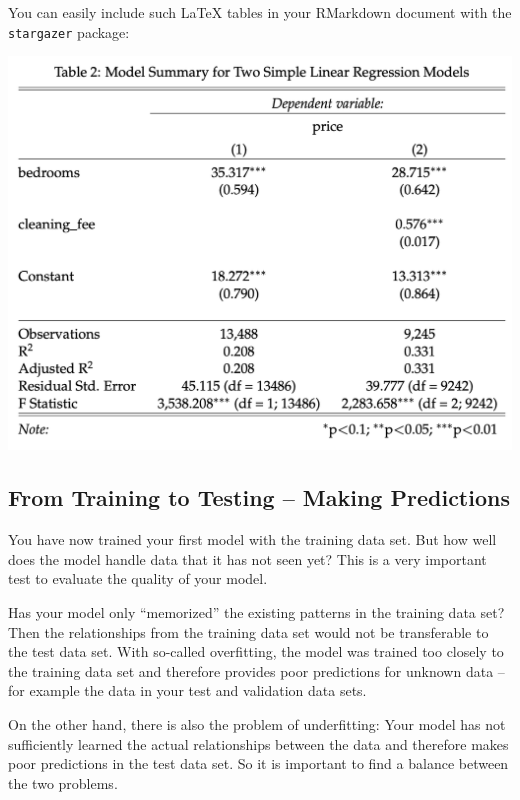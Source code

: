 \documentclass[
  11pt,
]{article}
\newenvironment{tips}[1]
  {
  \begin{itemize}
  \footnotesize
  \renewcommand{\labelitemi}{
    \raisebox{-.7\height}[0pt][0pt]{
      {\setkeys{Gin}{width=3em,keepaspectratio}
        \texttt{[image: images/\#1.png]}}
    }
  }
  \setlength{\fboxsep}{1em}
  \begin{rbox}
  \item
  }
  {
  \end{rbox}
  \end{itemize}
  }
\begin{document}
\begin{tips}r

You can easily include such LaTeX tables in your RMarkdown document with the \texttt{stargazer} package:

\begin{center}\includegraphics[width=1\linewidth]{plot/5_table} \end{center}

\end{tips}

\hypertarget{from-training-to-testing-making-predictions}{%
\subsection{From Training to Testing -- Making Predictions}\label{from-training-to-testing-making-predictions}}

You have now trained your first model with the training data set. But how well does the model handle data that it has not seen yet? This is a very important test to evaluate the quality of your model.

Has your model only ``memorized'' the existing patterns in the training data set?
Then the relationships from the training data set would not be transferable to the test data set. With so-called overfitting, the model was trained too closely to the training data set and therefore provides poor predictions for unknown data -- for example the data in your test and validation data sets.

On the other hand, there is also the problem of underfitting: Your model has not sufficiently learned the actual relationships between the data and therefore makes poor predictions in the test data set. So it is important to find a balance between the two problems.
\end{document}
